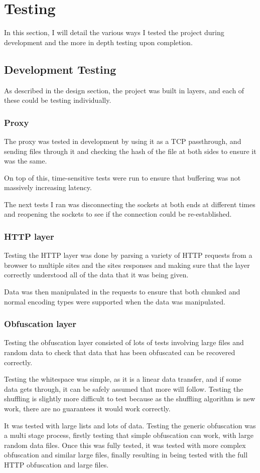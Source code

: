 \section{Testing}
In this section, I will detail the various ways I tested the project during development and the more in depth testing upon completion.
\subsection{Development Testing}
As described in the design section, the project was built in layers, and each of these could be testing individually.
\subsubsection{Proxy}
The proxy was tested in development by using it as a TCP passthrough, and sending files through it and checking the hash of the file at both sides to ensure it was the same.\par
On top of this, time-sensitive tests were run to ensure that buffering was not massively increasing latency.\par
The next tests I ran was disconnecting the sockets at both ends at different times and reopening the sockets to see if the connection could be re-established.\par
\subsubsection{HTTP layer}
Testing the HTTP layer was done by parsing a variety of HTTP requests from a browser to multiple sites and the sites responses and making sure that the layer correctly understood all of the data that it was being given.\par
Data was then manipulated in the requests to ensure that both chunked and normal encoding types were supported when the data was manipulated.
\subsubsection{Obfuscation layer}
Testing the obfuscation layer consisted of lots of tests involving large files and random data to check that data that has been obfuscated can be recovered correctly.\par
Testing the whitespace was simple, as it is a linear data transfer, and if some data gets through, it can be safely assumed that more will follow.
Testing the shuffling is slightly more difficult to test because as the shuffling algorithm is new work, there are no guarantees it would work correctly.\par It was tested with large lists and lots of data.
Testing the generic obfuscation was a multi stage process, firstly testing that simple obfuscation can work, with large random data files. Once this was fully tested, it was tested with more complex obfuscation and similar large files, finally resulting in being tested with the full HTTP obfuscation and large files.
